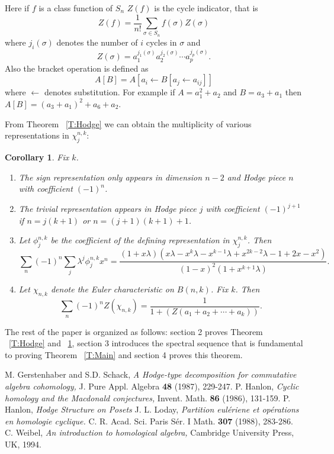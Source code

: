 \documentclass{amsart}
\newtheorem{corollary}[theorem]{Corollary}
\begin{document}
Here if $f$ is a class function of $S_n$ $Z(f)$ is the cycle indicator, that is $$Z(f) = \frac{1}{n!} \sum_{\sigma \in S_n}
 f(\sigma) Z(\sigma)$$ where $j_i(\sigma)$ denotes the number of $i$ cycles in $\sigma$ and $$Z(\sigma) = 
a_1^{j_1(\sigma)} a_2^{j_2(\sigma)} \cdots a_p^{j_p(\sigma)}.$$ Also the bracket operation is defined as $$A[B] = A[ a_i
\leftarrow B[a_j \leftarrow a_{ij}]]$$ where $\leftarrow$ denotes substitution. For example if $A = a_1^2 + a_2$ and 
$B= a_3+a_1$ then $A[B] = (a_3+a_1)^2 + a_6+a_2$. 


From Theorem ~\ref{T:Hodge} we can obtain the multiplicity of various representations in $\chi_j^{n, k}$:

\begin{corollary} \label{C:Hodge} 
  Fix $k$.
  \begin{enumerate} 
  \item The sign representation only appears in dimension $n-2$ and Hodge piece $n$ with coefficient $(-1)^n$.
  \item The trivial representation appears in Hodge piece $j$ with coefficient $(-1)^{j+1}$ if $n=j(k+1)$ or 
     	  $n=(j+1)(k+1) +1$.
  \item Let $\phi_j^{n, k}$ be the coefficient of the defining representation in $\chi_j^{n, k}$. Then 
        $$ \sum_n (-1)^n \sum_j \lambda^j \phi_j^{n, k}x^n = \frac{(1+x\lambda)(x\lambda - x^k\lambda -x^{k-1}\lambda +
        x^{2k-2}\lambda - 1 +2x -x^2)}{(1-x)^2(1+x^{k+1}\lambda)}.$$
  \item Let $\chi_{n, k}$ denote the Euler characteristic on $B(n, k)$. Fix $k$. Then $$\sum_n (-1)^n Z(\chi_{n, k}) = 
        \frac{1}{1 + (Z(a_1 + a_2 + \cdots + a_k))}.$$
  \end{enumerate} 
\end{corollary}


The rest of the paper is organized as follows: section 2 proves Theorem ~\ref{T:Hodge} and ~\ref{C:Hodge}, section 3 
introduces the spectral sequence that is fundamental to proving Theorem ~\ref{T:Main} and section 4 proves this theorem.

\begin{thebibliography}{9}
  M. Gerstenhaber and S.D. Schack,
  \emph{A Hodge-type decomposition for commutative algebra cohomology,}
  J. Pure Appl. Algebra {\bf 48} (1987), 229-247.
  P. Hanlon,
  \emph{Cyclic homology and the Macdonald conjectures,}
  Invent. Math. {\bf 86} (1986), 131-159.
  P. Hanlon,
  \emph{Hodge Structure on Posets}
  J. L. Loday,
  \emph{Partition eul\'eriene et op\'erations en homologie cyclique.}
  C. R. Acad. Sci. Paris S\'er. I Math. {\bf 307} (1988), 283-286.
  C. Weibel,
  \emph{An introduction to homological algebra,}
  Cambridge University Press, UK, 1994.

\end{thebibliography}
\end{document}

